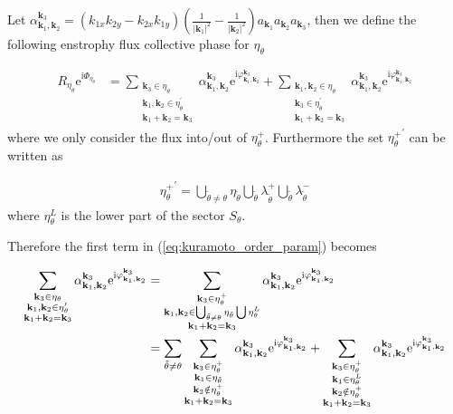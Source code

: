 \documentclass[9pt]{article}
\newcommand{\triad}[3]{\varphi_{#1, #2}^{#3}}                     %
\newcommand{\ii}{\mathrm{i}}      								  %
\newcommand{\e}{\mathrm{e}}      								  %
\newcommand{\alphakkk}[3]{\alpha_{\bfkn{#1}, \bfkn{#2}}^{\bfkn{#3}}}
\newcommand{\bfkn}[1]{\mathbf{k}_{#1}}								%
\begin{document}
Let $\alpha_{\bfkn{1}, \bfkn{2}}^{\bfkn{3}} = \left(k_{1 x} k_{2 y}-k_{2 x} k_{1 y}\right)\left(\frac{1}{\left|\mathbf{k}_{1}\right|^{2}}-\frac{1}{\left|\mathbf{k}_{2}\right|^{2}}\right) a_{\mathbf{k}_{1}} a_{\mathbf{k}_{2}} a_{\mathbf{k}_{3}}$, then we define the following enstrophy flux collective phase for $\eta_\theta$

\begin{align}
R_{\eta_\theta}\e^{\ii\Phi_{\eta_{\theta}}} &= \sum_{\substack{\bfkn{3} \in \eta_{\theta} \\ \bfkn{1},  \bfkn{2} \in \eta_{\theta}^{\prime} \\ \bfkn{1} + \bfkn{2} = \bfkn{3}}} \alphakkk{{1}}{2}{3}\e^{\ii \triad{\bfkn{1}}{\bfkn{2}}{\bfkn{3}}} + \sum_{\substack{\bfkn{1}, \bfkn{2} \in \eta_{\theta} \\ \bfkn{3} \in \eta_{\theta}^{\prime} \\ \bfkn{1} + \bfkn{2} = \bfkn{3}}} \alphakkk{{1}}{2}{3}\e^{\ii \triad{\bfkn{1}}{\bfkn{2}}{\bfkn{3}}} 
\label{eq:kuramoto_order_param}
\end{align}
where we only consider the flux into/out of $\eta_{\theta}^{+}$. Furthermore the set ${\eta_{\theta}^{+}}^{\prime}$ can be written as

\begin{align}
	{\eta_{\theta}^{+}}^{'} = \bigcup_{\tilde{\theta} \neq \theta} \eta_{\tilde{\theta}} \bigcup_{\tilde{\theta}} \lambda_{\tilde{\theta}}^{+} \bigcup_{\tilde{\theta}} \lambda_{\tilde{\theta}}^{-}
\end{align}
where $\eta_{\theta}^{L}$ is the lower part of the sector $S_{\theta}$.

Therefore the first term in (\ref{eq:kuramoto_order_param}) becomes

\begin{align}
	\sum_{\substack{\bfkn{3} \in \eta_{\theta} \\ \bfkn{1},  \bfkn{2} \in \eta_{\theta}^{\prime} \\ \bfkn{1} + \bfkn{2} = \bfkn{3}}} \alphakkk{{1}}{2}{3}\e^{\ii \triad{\bfkn{1}}{\bfkn{2}}{\bfkn{3}}} &= \sum_{\substack{\bfkn{3} \in \eta_{\theta}^{+} \\ \bfkn{1},  \bfkn{2} \in \bigcup_{\tilde{\theta} \neq \theta} \eta_{\tilde{\theta}} \bigcup \eta_{\theta}^{L} \\ \bfkn{1} + \bfkn{2} = \bfkn{3}}} \alphakkk{{1}}{2}{3}\e^{\ii \triad{\bfkn{1}}{\bfkn{2}}{\bfkn{3}}} \notag \\
	&= \sum_{\tilde{\theta} \neq \theta} \sum_{\substack{\bfkn{3} \in \eta_{\theta}^{+} \\ \bfkn{1} \in \eta_{\tilde{\theta}} \\ \bfkn{2} \notin \eta_{\theta}^{+} \\ \bfkn{1} + \bfkn{2} = \bfkn{3}}} \alphakkk{{1}}{2}{3}\e^{\ii \triad{\bfkn{1}}{\bfkn{2}}{\bfkn{3}}} + \sum_{\substack{\bfkn{3} \in \eta_{\theta}^{+} \\ \bfkn{1} \in \eta_{\theta}^{L} \\ \bfkn{2} \notin \eta_{\theta}^{+} \\ \bfkn{1} + \bfkn{2} = \bfkn{3}}} \alphakkk{{1}}{2}{3}\e^{\ii \triad{\bfkn{1}}{\bfkn{2}}{\bfkn{3}}}
\end{align}
\end{document}
